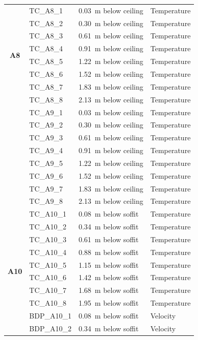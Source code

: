 \documentclass[12pt,oneside]{book}
\begin{document}
\begin{longtable}[c]{c|lll}
\midrule
\multirow{8}{*}{\large{\textbf{A8}}}
 & TC\_A8\_1  & 0.03~m below ceiling & Temperature \\
 & TC\_A8\_2  & 0.30~m below ceiling & Temperature \\
 & TC\_A8\_3  & 0.61~m below ceiling & Temperature \\
 & TC\_A8\_4  & 0.91~m below ceiling & Temperature \\
 & TC\_A8\_5  & 1.22~m below ceiling & Temperature \\
 & TC\_A8\_6  & 1.52~m below ceiling & Temperature \\
 & TC\_A8\_7  & 1.83~m below ceiling & Temperature \\
 & TC\_A8\_8  & 2.13~m below ceiling & Temperature \\
\bottomrule
\newpage
\multirow{8}{*}{\large{\textbf{A9}}}
 & TC\_A9\_1  & 0.03~m below ceiling & Temperature \\
 & TC\_A9\_2  & 0.30~m below ceiling & Temperature \\
 & TC\_A9\_3  & 0.61~m below ceiling & Temperature \\
 & TC\_A9\_4  & 0.91~m below ceiling & Temperature \\
 & TC\_A9\_5  & 1.22~m below ceiling & Temperature \\
 & TC\_A9\_6  & 1.52~m below ceiling & Temperature \\
 & TC\_A9\_7  & 1.83~m below ceiling & Temperature \\
 & TC\_A9\_8  & 2.13~m below ceiling & Temperature \\
\midrule
\multirow{19}{*}{\large\textbf{A10}}
 & TC\_A10\_1  & 0.08~m below soffit  & Temperature \\
 & TC\_A10\_2  & 0.34~m below soffit  & Temperature \\
 & TC\_A10\_3  & 0.61~m below soffit  & Temperature \\
 & TC\_A10\_4  & 0.88~m below soffit  & Temperature \\
 & TC\_A10\_5  & 1.15~m below soffit  & Temperature \\
 & TC\_A10\_6  & 1.42~m below soffit  & Temperature \\
 & TC\_A10\_7  & 1.68~m below soffit  & Temperature \\
 & TC\_A10\_8  & 1.95~m below soffit  & Temperature \\
\cline{2-4}
 & BDP\_A10\_1 & 0.08~m below soffit  & Velocity \\
 & BDP\_A10\_2 & 0.34~m below soffit  & Velocity \\

\end{longtable}
\end{document}
